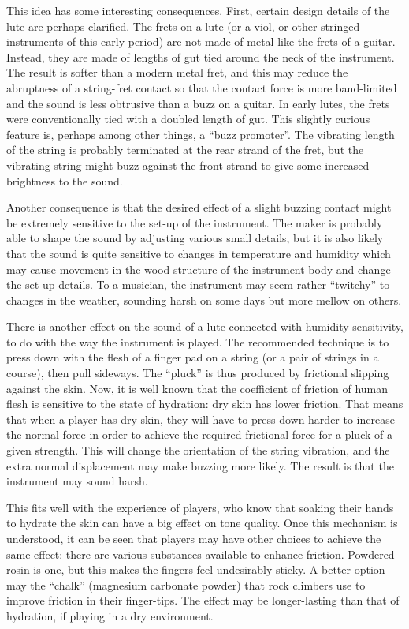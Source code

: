   This idea has some interesting consequences. First, certain design details of 
  the lute are perhaps clarified. The frets on a lute (or a viol, or other 
  stringed instruments of this early period) are not made of metal like the 
  frets of a guitar. Instead, they are made of lengths of gut tied around the 
  neck of the instrument. The result is softer than a modern metal fret, and 
  this may reduce the abruptness of a string-fret contact so that the contact 
  force is more band-limited and the sound is less obtrusive than a buzz on a 
  guitar. In early lutes, the frets were conventionally tied with a doubled 
  length of gut. This slightly curious feature is, perhaps among other things, 
  a “buzz promoter”. The vibrating length of the string is probably terminated 
  at the rear strand of the fret, but the vibrating string might buzz against 
  the front strand to give some increased brightness to the sound. 

  Another consequence is that the desired effect of a slight buzzing contact 
  might be extremely sensitive to the set-up of the instrument. The maker is 
  probably able to shape the sound by adjusting various small details, but it 
  is also likely that the sound is quite sensitive to changes in temperature 
  and humidity which may cause movement in the wood structure of the instrument 
  body and change the set-up details. To a musician, the instrument may seem 
  rather “twitchy” to changes in the weather, sounding harsh on some days but 
  more mellow on others. 

  There is another effect on the sound of a lute connected with humidity 
  sensitivity, to do with the way the instrument is played. The recommended 
  technique is to press down with the flesh of a finger pad on a string (or a 
  pair of strings in a course), then pull sideways. The “pluck” is thus 
  produced by frictional slipping against the skin. Now, it is well known that 
  the coefficient of friction of human flesh is sensitive to the state of 
  hydration: dry skin has lower friction. That means that when a player has dry 
  skin, they will have to press down harder to increase the normal force in 
  order to achieve the required frictional force for a pluck of a given 
  strength. This will change the orientation of the string vibration, and the 
  extra normal displacement may make buzzing more likely. The result is that 
  the instrument may sound harsh. 

  This fits well with the experience of players, who know that soaking their 
  hands to hydrate the skin can have a big effect on tone quality. Once this 
  mechanism is understood, it can be seen that players may have other choices 
  to achieve the same effect: there are various substances available to enhance 
  friction. Powdered rosin is one, but this makes the fingers feel undesirably 
  sticky. A better option may the “chalk” (magnesium carbonate powder) that 
  rock climbers use to improve friction in their finger-tips. The effect may be 
  longer-lasting than that of hydration, if playing in a dry environment. 



